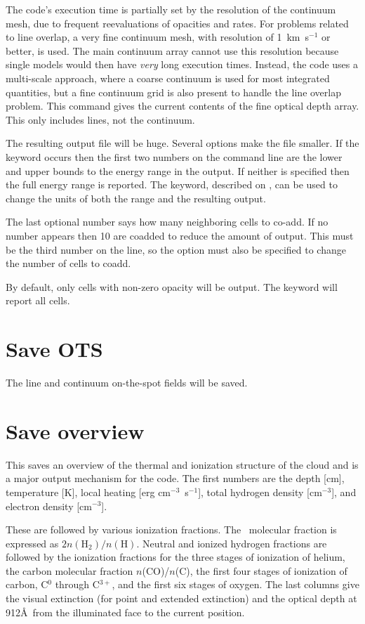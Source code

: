 The code's execution time is partially set by the resolution of the
continuum mesh, due to frequent reevaluations of opacities and rates.
For problems related to line overlap, a very fine continuum mesh, with resolution
of 1~km~s$^{-1}$ or better, is used.
The main continuum array cannot use this
resolution because single models would then have \emph{very} long execution times.
Instead, the code uses a multi-scale approach, where a coarse continuum
is used for most integrated quantities, but a fine continuum grid is also
present to handle the line overlap problem.  This command gives the current
contents of the fine optical depth array.  This only includes lines, not
the continuum.

The resulting output file
will be huge.  Several options make the file smaller.
If the keyword  occurs then the first two numbers on
the command line are the lower and upper bounds to the energy range in the
output.  If neither is specified then the full energy range is reported.
The  keyword, described on \pageref{output_units},
can be used to change the units of both the range and the resulting output.

The last optional number says how many neighboring cells to co-add.  If
no number appears then 10 are coadded to reduce the amount of output.
This must be the third number on the line, so the  option
must also be specified to change the number of cells to coadd.

By default, only cells with non-zero opacity will be output.  
The keyword  will report all cells.

\section{Save OTS}

The line and continuum on-the-spot fields will be saved.

\section{Save overview}

This saves an overview of the thermal and ionization structure
of the cloud and is a major output mechanism for the code.
The first numbers
are the depth [cm], temperature [K], local heating [erg cm$^{-3}$~s$^{-1}$], total
hydrogen density [cm$^{-3}$], and electron density [cm$^{-3}$].

These are followed by various ionization fractions.  
The \htwo\ molecular fraction is expressed as
$2n(\mathrm{H}_2)/n(\mathrm{H})$.
Neutral and ionized hydrogen fractions are followed by the ionization
fractions for the three stages of ionization of helium, the carbon molecular
fraction $n$(CO)/$n$(C), the first four stages of ionization of carbon, 
C$^0$ through C$^{3+}$, and
the first six stages of oxygen.  The last columns give the visual extinction
(for point and extended extinction) and the optical depth at 912\AA\ 
from the illuminated face to the current
position.

